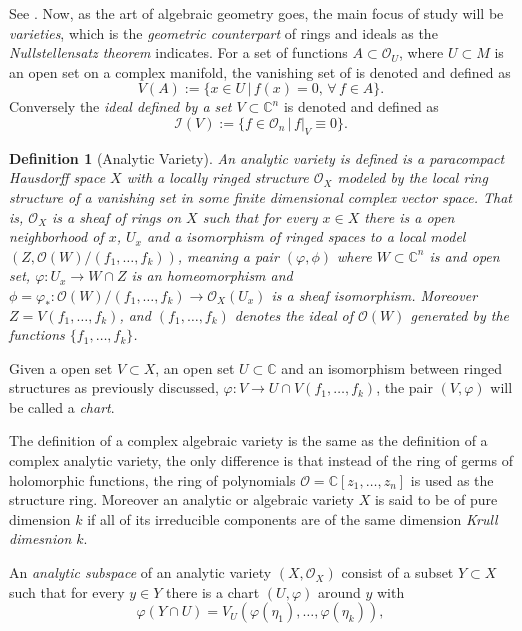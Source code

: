 \documentclass[12pt,twoside,a4paper]{report}
\newtheorem{definition}{Definition}[section]
\newcommand{\co}{\ensuremath{\mathbb C }}
\newcommand{\con}{\ensuremath{\mathbb{C}^n}}
\newcommand{\osheaf}{\ensuremath{\mathcal O }}
\begin{document}
See \cite{Gunnin-Rossi}. Now, as the art of algebraic geometry goes, the main focus of study will be \emph{varieties}, which is the \emph{geometric counterpart} of rings and ideals as the \emph{Nullstellensatz theorem} indicates. For a set of functions $A\subset\osheaf_{U}$, where $U\subset M$ is an open set on a complex manifold, the vanishing set of is denoted and defined as
\[
  V(A):=\{x\in U\,\vert\,f(x)=0,\,\forall\,f\in A\}.
\]
\noindent Conversely the \emph{ideal defined by a set $V\subset\con$} is denoted and defined as
\[
  \mathcal{I}(V):=\{f\in\osheaf_{n}\,|\,f|_{V}\equiv0\}.
\]
\begin{definition}[Analytic Variety]
  An \emph{analytic variety} is defined is a paracompact Hausdorff space $X$ with a locally ringed structure $\osheaf_{X}$ modeled by the local ring structure of a vanishing set in some finite dimensional complex vector space. That is, $\osheaf_{X}$ is a sheaf of rings on $X$ such that for every $x\in X$ there is a open neighborhood of $x$, $U_{x}$ and a isomorphism of ringed spaces to a local model $(Z,\osheaf(W)/(f_{1},\dots,f_{k}))$, meaning a pair $(\varphi,\phi)$ where $W\subset\con$ is and open set, $\varphi:U_{x}\rightarrow W\cap Z$ is an homeomorphism and $\phi=\varphi_{*}:\osheaf(W)/(f_{1},\dots,f_{k})\rightarrow\osheaf_{X}(U_{x})$ is a sheaf isomorphism. Moreover $Z=V(f_{1},\dots,f_{k})$, and $(f_{1},\dots,f_{k})$ denotes the ideal of $\osheaf(W)$ generated by the functions $\{f_{1},\dots,f_{k}\}$.
\end{definition}
\noindent Given a open set $V\subset X$, an open set $U\subset\co$ and an isomorphism between ringed structures as previously discussed, $\varphi:V\rightarrow U\cap V(f_{1},\dots,f_{k})$, the pair $(V,\varphi)$ will be called a \emph{chart}.

The definition of a complex algebraic variety is the same as the definition of a complex analytic variety, the only difference is that instead of the ring of germs of holomorphic functions, the ring of polynomials $\osheaf=\co[z_{1},\dots,z_{n}]$ is used as the structure ring. Moreover an analytic or algebraic variety $X$ is said to be of pure dimension $k$ if all of its irreducible components are of the same dimension \emph{Krull dimesnion $k$}.

An \emph{analytic subspace} of an analytic variety $(X,\osheaf_{X})$ consist of a subset $Y\subset X$ such that for every $y\in Y$ there is a chart $(U,\varphi)$ around $y$ with
\[
  \varphi(Y\cap U)=V_U(\varphi(\eta_1),\dots,\varphi(\eta_k)),
\]
\end{document}
